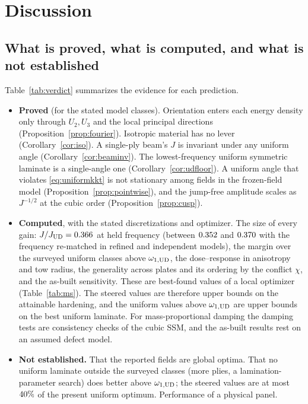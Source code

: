 \section{Discussion}\label{sec:discussion}

\subsection{What is proved, what is computed, and what is not established}
Table~\ref{tab:verdict} summarizes the evidence for each prediction.
\begin{itemize}[itemsep=2pt]
\item \textbf{Proved} (for the stated model classes). Orientation enters each energy density only
  through $U_2,U_3$ and the local principal directions (Proposition~\ref{prop:fourier}). Isotropic
  material has no lever (Corollary~\ref{cor:iso}). A single-ply beam's $J$ is invariant under any
  uniform angle (Corollary~\ref{cor:beaminv}). The lowest-frequency uniform symmetric laminate is a
  single-angle one (Corollary~\ref{cor:udfloor}). A uniform angle that violates
  \eqref{eq:uniformkkt} is not stationary among fields in the frozen-field model
  (Proposition~\ref{prop:pointwise}), and the jump-free amplitude scales as $J^{-1/2}$ at the cubic
  order (Proposition~\ref{prop:cusp}).
\item \textbf{Computed}, with the stated discretizations and optimizer. The size of every gain:
  $J/J_{\mathrm{UD}}=0.366$ at held frequency (between $0.352$ and $0.370$ with the frequency re-matched in
  refined and independent models), the margin over the surveyed uniform classes above
  $\omega_{1,\mathrm{UD}}$, the dose--response in anisotropy and tow radius, the generality across plates and
  its ordering by the conflict $\chi$, and the as-built sensitivity. These are best-found values of a
  local optimizer (Table~\ref{tab:ms}). The steered values are therefore upper bounds on the attainable
  hardening, and the uniform values above $\omega_{1,\mathrm{UD}}$ are upper bounds on the best uniform laminate.
  For mass-proportional damping the damping tests are consistency checks of the cubic SSM, and the
  as-built results rest on an assumed defect model.
\item \textbf{Not established.} That the reported fields are global optima. That no uniform laminate
  outside the surveyed classes (more plies, a lamination-parameter search) does better above
  $\omega_{1,\mathrm{UD}}$; the steered values are at most $40\%$ of the present uniform
  optimum. Performance of a physical panel.
\end{itemize}

